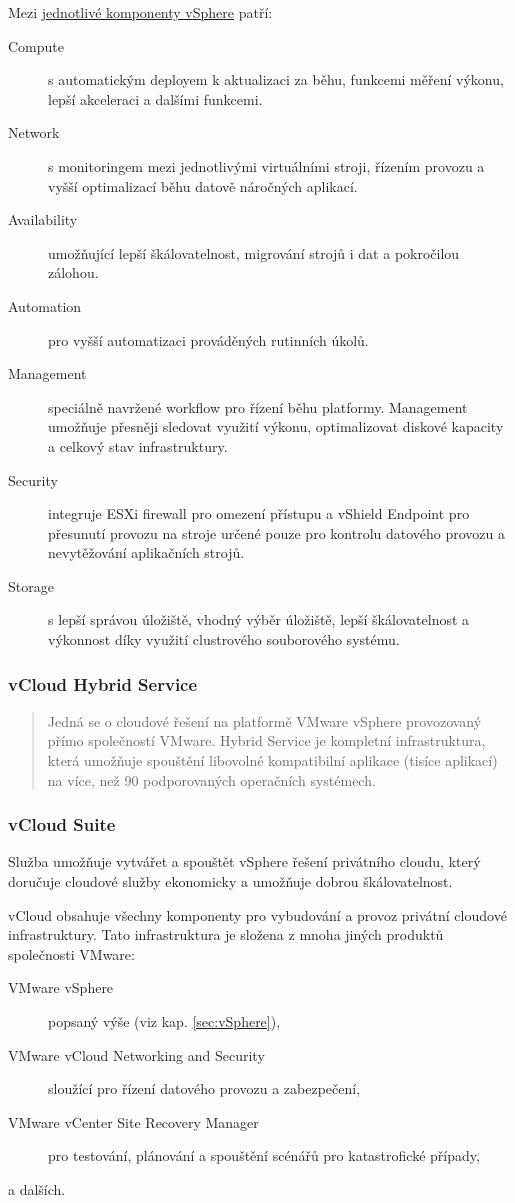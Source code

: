 Mezi \href{http://www.vmware.com/products/vsphere/features.html}{jednotlivé komponenty vSphere} patří:
\begin{description}
	\item[Compute] s automatickým deployem k aktualizaci za běhu, funkcemi měření výkonu, lepší akceleraci a dalšími funkcemi.
	\item[Network] s monitoringem mezi jednotlivými virtuálními stroji, řízením provozu a vyšší optimalizací běhu datově náročných aplikací.
	\item[Availability] umožňující lepší škálovatelnost, migrování strojů i dat a pokročilou zálohou.
	\item[Automation] pro vyšší automatizaci prováděných rutinních úkolů.
	\item[Management] speciálně navržené workflow pro řízení běhu platformy. Management umožňuje přesněji sledovat využití výkonu, optimalizovat diskové kapacity a celkový stav infrastruktury.
	\item[Security] integruje ESXi firewall pro omezení přístupu a vShield Endpoint pro přesunutí provozu na stroje určené pouze pro kontrolu datového provozu a nevytěžování aplikačních strojů.
	\item[Storage] s lepší správou úložiště, vhodný výběr úložiště, lepší škálovatelnost a výkonnost díky využití clustrového souborového systému.
\end{description}

\subsubsection{vCloud Hybrid Service}
\begin{quote}
Jedná se o cloudové řešení na platformě VMware vSphere provozovaný přímo společností VMware. Hybrid Service je kompletní infrastruktura, která umožňuje spouštění libovolné kompatibilní aplikace (tisíce aplikací) na více, než 90 podporovaných operačních systémech.\cite{vmware:hybridService}
\end{quote}

\subsubsection{vCloud Suite}
Služba umožňuje vytvářet a spouštět vSphere řešení privátního cloudu, který doručuje cloudové služby ekonomicky a umožňuje dobrou škálovatelnost.\cite{vmware:vCloudDatasheet}

vCloud obsahuje všechny komponenty pro vybudování a provoz privátní cloudové infrastruktury. Tato infrastruktura je složena z mnoha jiných produktů společnosti VMware:
\begin{description}
	\item[VMware vSphere] popsaný výše (viz kap. \ref{sec:vSphere}),
	\item[VMware vCloud Networking and Security] sloužící pro řízení datového provozu a zabezpečení,
	\item[VMware vCenter Site Recovery Manager] pro testování, plánování a spouštění scénářů pro katastrofické případy,
	\item[a dalších.]
\end{description}

